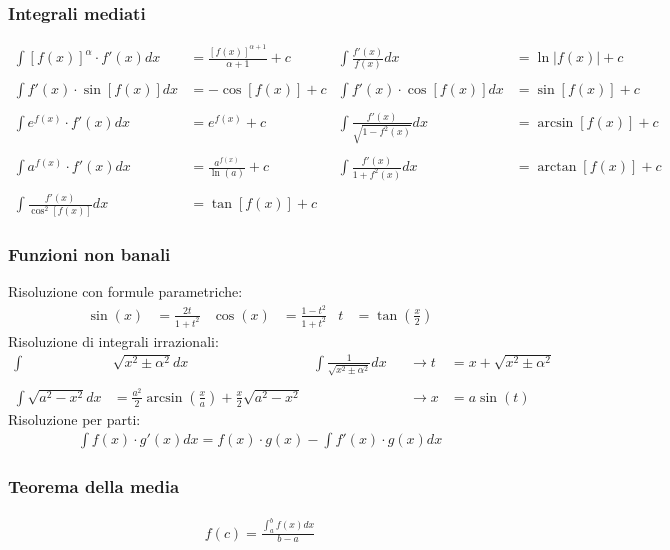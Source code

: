 \documentclass[a4paper]{article}
\begin{document}
	\subsubsection*{Integrali mediati}
	\begin{align*}
		\int [f(x)]^\alpha \cdot f'(x) dx 	&= \frac{[f(x)]^{\alpha + 1}}{\alpha + 1}+c		&	\int \frac{f'(x)}{f(x)}dx &= \ln |f(x)| + c\\\\
		\int f'(x) \cdot \sin [f(x)] dx		&= -\cos [f(x)] + c								&	\int f'(x) \cdot \cos [f(x)] dx &= \sin [f(x)] + c\\\\
		\int e^{f(x)} \cdot f'(x) dx 		&= e^{f(x)}+c									&	\int \frac{f'(x)}{\sqrt{1-f^2(x)}}dx &= \arcsin[f(x)] + c\\\\
		\int a^{f(x)} \cdot f'(x) dx		&= \frac{a^{f(x)}}{\ln (a)}+c					&	\int \frac{f'(x)}{1+f^2(x)}dx &= \arctan [f(x)] + c\\\\
		\int \frac{f'(x)}{\cos^2 [f(x)]}dx	&= \tan [f(x)] + c  		
	\end{align*}
	\subsubsection*{Funzioni non banali}
	Risoluzione con formule parametriche:
	\begin{align*}
		\sin (x) &= \frac{2t}{1+t^2}		&		\cos (x) &= \frac{1-t^2}{1+t^2}			& 	t &= \tan \left( \frac{x}{2} \right)
	\end{align*}
	Risoluzione di integrali irrazionali:
	\begin{align*}
		\int & \sqrt{x^2 \pm \alpha^2}	dx		&		\int  \frac{1}{\sqrt{x^2 \pm \alpha^2}}dx&	&	\rightarrow t &= x + \sqrt{x^2 \pm \alpha^2}\\\\
		\int \sqrt{a^2 - x^2}dx &= \frac{a^2}{2}\arcsin \left( \frac{x}{a} \right) + \frac{x}{2}\sqrt{a^2-x^2}	&&	&		\rightarrow x &= a\sin (t)
	\end{align*}
	Risoluzione per parti:
	\begin{align*}
		\int f(x) \cdot g'(x) dx = f(x) \cdot g(x) - \int f'(x) \cdot g(x) dx
	\end{align*}
		
	\subsubsection*{Teorema della media}
	\begin{align*}
		f(c) = \frac{\int_{a}^{b}f(x)dx}{b-a}
	\end{align*}
\end{document}
